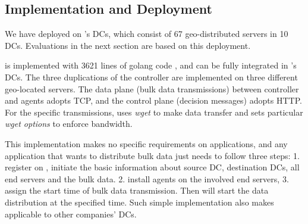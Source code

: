 \subsection{Implementation and Deployment}
\label{sec:deployment}


We have deployed \name on \company's DCs, which consist of 67 geo-distributed servers in 10 DCs. Evaluations in the next section are based on this deployment. %

\name is implemented with 3621 lines of golang code \cite{golang}, and can be fully integrated in \company's DCs. The three duplications of the controller are implemented on three different geo-located servers. The data plane (bulk data transmissions) between controller and agents adopts TCP, and the control plane (decision messages) adopts HTTP. For the specific transmissions, \name uses \emph{wget} to make data transfer and sets particular \emph{wget options} to enforce bandwidth.

This implementation makes no specific requirements on applications, and any application that wants to distribute bulk data just needs to follow three steps: 1. register on \name, initiate the basic information about source DC, destination DCs, all end servers and the bulk data. 2. install agents on the involved end servers, 3. assign the start time of bulk data transmission. Then \name will start the data distribution at the specified time. Such simple implementation also makes \name applicable to other companies' DCs. 	






%
%
%
%
%

